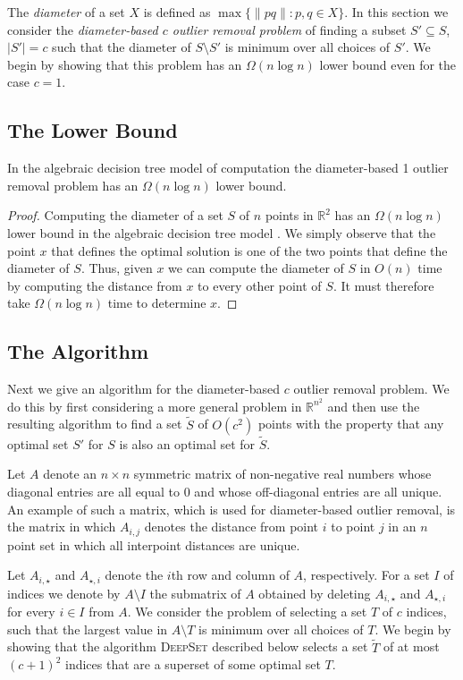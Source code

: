 \documentclass{elsart}
\begin{document}
The \emph{diameter} of a set $X$ is defined as $\max\{\|pq\|:p,q\in
X\}$.  In this section we consider the \emph{diameter-based $c$ outlier
removal problem} of finding a subset $S'\subseteq S$, $|S'|=c$ such
that the diameter of $S\setminus S'$ is minimum over all choices of
$S'$.  We begin by showing that this problem has an $\Omega(n\log n)$
lower bound even for the case $c=1$.

\subsection{The Lower Bound}

\begin{thm}
In the algebraic decision tree model of computation the diameter-based
1 outlier removal problem has 
an $\Omega(n\log n)$ lower bound.
\end{thm}

\begin{proof}
Computing the diameter of a set $S$ of $n$ points in $\mathbb{R}^2$
has an $\Omega(n\log n)$ lower bound in the algebraic decision tree
model \cite{ps85}.  We simply observe that the point $x$ that defines
the optimal solution is one of the two points that define the diameter
of $S$. Thus, given $x$ we can compute the diameter of $S$ in $O(n)$
time by computing the distance from $x$ to every other point of $S$.
It must therefore take $\Omega(n\log n)$ time to determine $x$. 
\end{proof}


\subsection{The Algorithm}

Next we give an algorithm for the diameter-based $c$ outlier removal
problem.  We do this by first considering a more general problem in
$\mathbb{R}^{n^2}$ and then use the resulting algorithm to find
a set $\tilde{S}$ of $O(c^2)$ points with the property that any
optimal set $S'$ for $S$ is also an optimal set for $\tilde{S}$. 

Let $A$ denote an $n\times n$ symmetric matrix of non-negative real
numbers whose diagonal entries are all equal to 0 and whose
off-diagonal entries are all unique.  An example of such a matrix,
which is used for diameter-based outlier removal, is the matrix in
which $A_{i,j}$ denotes the distance from point $i$ to point $j$ in an
$n$ point set in which all interpoint distances are unique.

Let $A_{i,\star}$ and
$A_{\star,i}$ denote the $i$th row and column of $A$, respectively.  For
a set $I$ of indices we denote by $A\setminus I$ the submatrix of $A$
obtained by deleting $A_{i,\star}$ and $A_{\star,i}$ for every $i\in
I$ from $A$.  We consider the problem of selecting a set $T$ of $c$
indices, such that the largest value in $A\setminus T$ is minimum over
all choices of $T$.  We begin by showing that the algorithm
\textsc{DeepSet} described below selects a set $\tilde{T}$ of
at most $(c+1)^2$ indices that are a superset of some optimal set $T$.
\end{document}
